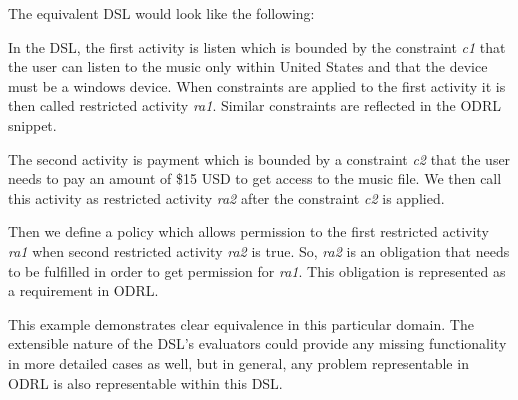

The equivalent DSL would look like the following:



In the DSL, the first activity is listen which is bounded by the constraint {\em c1} that the user can listen to the music only within United States and that the device must be a windows device. When constraints are applied to the first activity it is then called restricted activity {\em ra1}. Similar constraints are reflected in the ODRL snippet.

The second activity is payment which is bounded by a constraint {\em c2} that the user needs to pay an amount of \$15 USD to get access to the music file. We then call this activity as restricted activity {\em ra2} after the constraint {\em c2} is applied. 

Then we define a policy which allows permission to the first restricted activity {\em ra1} when second restricted activity {\em ra2} is true. So, {\em ra2} is an obligation that needs to be fulfilled in order to get permission for {\em ra1}. This obligation is represented as a requirement in ODRL.

This example demonstrates clear equivalence in this particular domain.  The extensible nature of the DSL's evaluators could provide any missing functionality in more detailed cases as well, but in general, any problem representable in ODRL is also representable within this DSL.